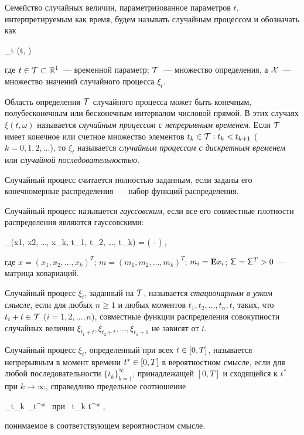 \begin{df}
    Семейство случайных величин, параметризованное параметров $t$, интерпретируемым как время, будем называть случайным процессом и обозначать как
    
    \beqn
    	\xi_t \eqdef \xi(t, \omega) \in \setX \subset {}
    \eeqn

    где $t \in \mathcal{T} \subset \mathbb{R}^{1}$~--- временной параметр; $\mathcal{T}$~--- множество определения, а $\mathcal{X}$~--- множество значений случайного процесса $\xi_t$.
\end{df}

Область определения $\mathcal{T}$ случайного процесса может быть конечным, полубесконечным или бесконечным интервалом числовой прямой. В этих случаях $\xi(t, \omega)$ называется \emph{случайным процессом с непрерывным временем}. Если $\mathcal{T}$ имеет конечное или счетное множество элементов $t_k \in \mathcal{T}: t_k < t_{k+1}$ ($k = 0, 1, 2, \ldots$), то $\xi_t$ называется \emph{случайным процессом с дискретным временем} или \emph{случайной последовательностью}.

Случайный процесс считается полностью заданным, если заданы его конечномерные распределения~--- набор функций распределения.

Случайный процесс называется \emph{гауссовским}, если все его совместные плотности распределения являются гауссовскими:

\beqn
	\prob_\xi(x1, x2, \ldots, x_k, t_1, t_2, \ldots, t_k) = \exp\biggl( - \biggr) \mbox{,}
\eeqn

где $x = (x_1, x_2, \ldots, x_k)^T$; $m = (m_1, m_2, \ldots, m_k)^T$; $m_i = \mathbf{E} x_i$; $\mathsf{\Sigma} = \mathsf{\Sigma}^T > 0$~--- матрица ковариаций.

Случайный процесс $\xi_t$, заданный на $\mathcal{T}$, называется \emph{стационарным в узком смысле}, если для любых $n \geqslant 1$ и любых моментов $t_1, t_2, \ldots, t_n, t$, таких, что $t_i + t \in \mathcal{T}$ ($i = 1, 2, \ldots, n$), совместные функции распределения совокупности случайных величин $\xi_{t_1+t}, \xi_{t_2+t}, \ldots, \xi_{t_n+1}$ не зависят от $t$.

\begin{df}
	Случайный процесс $\xi_t$, определенный при всех $t \in [0, T]$, называется непрерывным в момент времени $t^{*} \in [0, T]$ в вероятностном смысле, если для любой последовательности $\{t_k\}_{k=1}^\infty$, принадлежащей $[0, T]$ и сходящейся к $t^{*}$ при $k \to \infty$, справедливо предельное соотношение
	
	\beqn
		\xi_{t_k} \to \xi_{t^{*}} \mbox{ при } t_k \to t^{*}  \mbox{,}
	\eeqn
	
	понимаемое в соответствующем вероятностном смысле.
\end{df}

